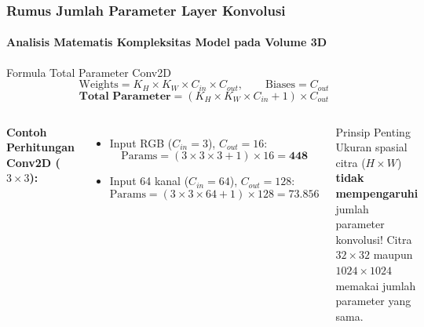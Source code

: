 \documentclass[t,aspectratio=169,xcolor=dvipsnames]{beamer}
\begin{document}
\begin{frame}
    \frametitle{Rumus Jumlah Parameter Layer Konvolusi}
    \framesubtitle{Analisis Matematis Kompleksitas Model pada Volume 3D}
    \footnotesize

    \begin{exampleblock}{Formula Total Parameter Conv2D}
        $$\text{Weights} = K_H \times K_W \times C_{in} \times C_{out}, \qquad \text{Biases} = C_{out}$$
        $$\mathbf{\text{Total Parameter}} = (K_H \times K_W \times C_{in} + 1) \times C_{out}$$
    \end{exampleblock}

    \begin{columns}[t]
        \textbf{Contoh Perhitungan Conv2D ($3\times3$):}
        \begin{itemize}
            \item Input RGB ($C_{in} = 3$), $C_{out} = 16$:
            $$\text{Params} = (3 \times 3 \times 3 + 1) \times 16 = \mathbf{448}$$
            \item Input 64 kanal ($C_{in} = 64$), $C_{out} = 128$:
            $$\text{Params} = (3 \times 3 \times 64 + 1) \times 128 = \mathbf{73.856}$$
        \end{itemize}

        \begin{alertblock}{Prinsip Penting}
            Ukuran spasial citra ($H \times W$) \textbf{tidak mempengaruhi} jumlah parameter konvolusi! Citra $32\times32$ maupun $1024\times1024$ memakai jumlah parameter yang sama.
        \end{alertblock}
    \end{columns}
\end{frame}
\end{document}
